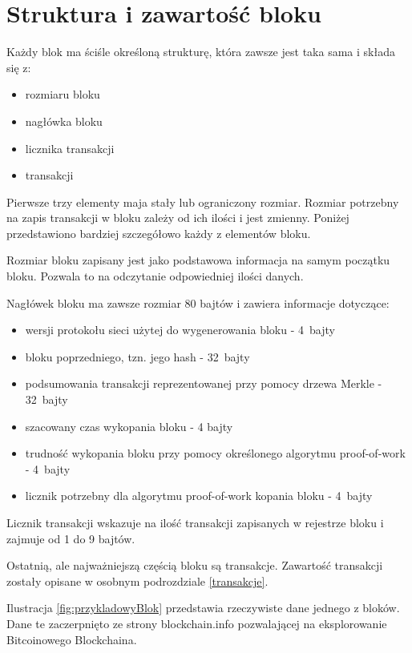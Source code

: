 \documentclass[12pt, twoside, final, openany]{mgr}
\begin{document}
\section{Struktura i zawartość bloku}
\label{zawartoscBloku}
\indent Każdy blok ma ściśle określoną strukturę, która zawsze jest taka sama i składa się z:
\begin{itemize}
\item rozmiaru bloku
\item nagłówka bloku
\item licznika transakcji
\item transakcji 
\end{itemize}

\indent Pierwsze trzy elementy maja stały lub ograniczony rozmiar. Rozmiar potrzebny na zapis transakcji w bloku zależy od ich ilości i jest zmienny. Poniżej przedstawiono bardziej szczegółowo każdy z elementów bloku. 

\indent Rozmiar bloku zapisany jest jako podstawowa informacja na samym początku bloku. Pozwala to na odczytanie odpowiedniej ilości danych. 

\indent Nagłówek bloku ma zawsze rozmiar 80 bajtów i zawiera informacje dotyczące:
\begin{itemize}
\item wersji protokołu sieci użytej do wygenerowania bloku - 4~bajty
\item bloku poprzedniego, tzn. jego hash - 32~bajty
\item podsumowania transakcji reprezentowanej przy pomocy drzewa Merkle - 32~bajty
\item szacowany czas wykopania bloku - 4 bajty
\item trudność wykopania bloku przy pomocy określonego algorytmu proof-of-work - 4~bajty
\item licznik potrzebny dla algorytmu proof-of-work kopania bloku - 4~bajty
\end{itemize} 

\indent Licznik transakcji wskazuje na ilość transakcji zapisanych w rejestrze bloku i zajmuje od 1 do 9 bajtów.

\indent Ostatnią, ale najważniejszą częścią bloku są transakcje. Zawartość transakcji zostały opisane w osobnym podrozdziale \ref{transakcje}.

\indent Ilustracja \ref{fig:przykladowyBlok} przedstawia rzeczywiste dane jednego z bloków. Dane te zaczerpnięto ze strony blockchain.info pozwalającej na eksplorowanie Bitcoinowego Blockchaina\cite{blockchaininfo}.
\end{document}
